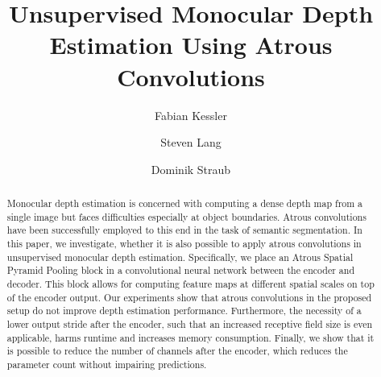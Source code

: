 \documentclass[10pt,twocolumn,letterpaper]{article}
\begin{document}
\title{Unsupervised Monocular Depth Estimation Using Atrous Convolutions}

\author{Fabian Kessler}
\author{Steven Lang}
\author{Dominik Straub}


\maketitle
\begin{abstract}
Monocular depth estimation is concerned with computing a dense depth map from a single image but faces difficulties especially at object boundaries.
Atrous convolutions have been successfully employed to this end in the task of semantic segmentation.
In this paper, we investigate, whether it is  also possible to apply atrous convolutions in unsupervised monocular depth estimation. 
Specifically, we place an Atrous Spatial Pyramid Pooling block in a convolutional neural network between the encoder and decoder. 
This block allows for computing feature maps at different spatial scales on top of the encoder output. 
Our experiments show that atrous convolutions in the proposed setup do not improve depth estimation performance. 
Furthermore, the necessity of a lower output stride after the encoder, such that an increased receptive field size is even applicable, harms runtime and increases memory consumption. 
Finally, we show that it is possible to reduce the number of channels after the encoder, which reduces the parameter count without impairing predictions.
\end{abstract}












{\small


}

\clearpage

\end{document}
